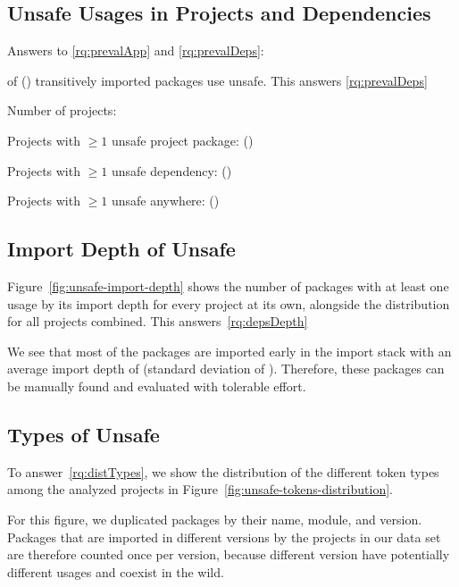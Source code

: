 

\subsection{Unsafe Usages in Projects and Dependencies}

Answers to \ref{rq:prevalApp} and \ref{rq:prevalDeps}:

 of  () transitively imported packages use unsafe. This answers \ref{rq:prevalDeps}

Number of projects: 

Projects with $\geq 1$ unsafe project package:  ()

Projects with $\geq 1$ unsafe dependency:  ()

Projects with $\geq 1$ unsafe anywhere:  ()


\subsection{Import Depth of Unsafe}

Figure~\ref{fig:unsafe-import-depth} shows the number of packages with at least one \unsafe{} usage by its import depth for every project at its own, alongside the distribution for all projects combined. This answers~\ref{rq:depsDepth}

We see that most of the packages are imported early in the import stack with an average import depth of \averageUnsafeImportDepth (standard deviation of \stdUnsafeImportDepth).
Therefore, these packages can be manually found and evaluated with tolerable effort.




\subsection{Types of Unsafe}

To answer~\ref{rq:distTypes}, we show the distribution of the different \unsafe{} token types among the analyzed projects in Figure~\ref{fig:unsafe-tokens-distribution}.

For this figure, we duplicated packages by their name, module, and version. Packages that are imported in different versions by the projects in our data set are therefore counted once per version, because different version have potentially different \unsafe{} usages and coexist in the wild.

